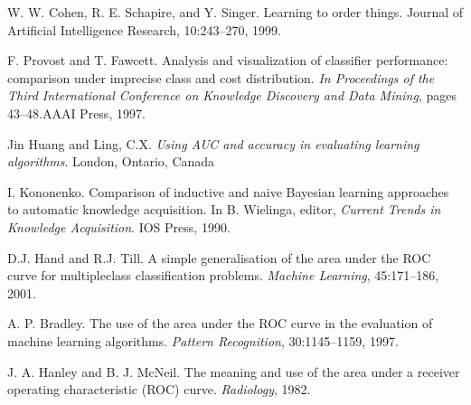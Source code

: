 \documentclass[twoside, twocolumn, 12pt]{article}
\begin{document}
\begin{thebibliography}{9}

W. W. Cohen, R. E. Schapire, and Y. Singer. Learning to order things. Journal of Artificial Intelligence Research, 10:243–270, 1999.

F. Provost and T. Fawcett. Analysis and visualization of classifier performance: comparison under imprecise class and cost distribution. \textit{In Proceedings of the Third International Conference on Knowledge Discovery and Data Mining}, pages 43–48.AAAI Press, 1997.

{Jin Huang} and Ling, C.X. \textit{Using {AUC} and accuracy in evaluating learning algorithms}. London, Ontario, Canada

I. Kononenko. Comparison of inductive and naive Bayesian learning approaches to automatic knowledge acquisition. In B. Wielinga, editor, \textit{Current Trends in Knowledge Acquisition}. IOS Press, 1990.

D.J. Hand and R.J. Till. A simple generalisation of the area under the ROC curve for multipleclass classification problems. \textit{Machine Learning}, 45:171–186, 2001.

A. P. Bradley. The use of the area under the ROC curve in the evaluation of machine learning algorithms. \textit{Pattern Recognition}, 30:1145–1159, 1997.

J. A. Hanley and B. J. McNeil. The meaning and use of the area under a receiver operating characteristic (ROC) curve. \textit{Radiology}, 1982.



\end{thebibliography}
\end{document}
